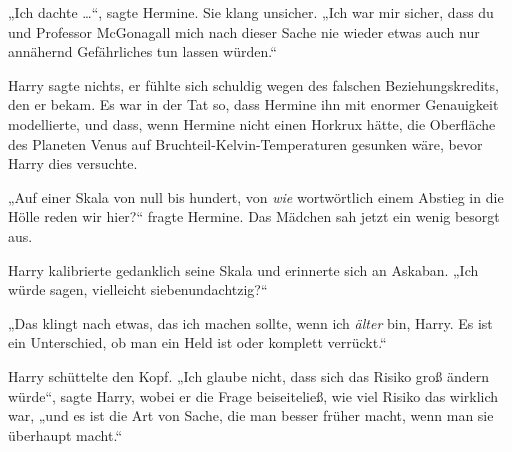 „Ich dachte …“, sagte Hermine. Sie klang unsicher.
„Ich war mir sicher, dass du und Professor McGonagall mich nach dieser Sache nie wieder etwas auch nur annähernd Gefährliches tun lassen würden.“

Harry sagte nichts, er fühlte sich schuldig wegen des falschen Beziehungskredits, den er bekam. Es war in der Tat so, dass Hermine ihn mit enormer Genauigkeit modellierte, und dass, wenn Hermine nicht einen Horkrux hätte, die Oberfläche des Planeten Venus auf Bruchteil-Kelvin-Temperaturen gesunken wäre, bevor Harry dies versuchte.

„Auf einer Skala von null bis hundert, von \emph{wie} wortwörtlich einem Abstieg in die Hölle reden wir hier?“ fragte Hermine. Das Mädchen sah jetzt ein wenig besorgt aus.

Harry kalibrierte gedanklich seine Skala und erinnerte sich an Askaban.
„Ich würde sagen, vielleicht siebenundachtzig?“

„Das klingt nach etwas, das ich machen sollte, wenn ich \emph{älter} bin, Harry. Es ist ein Unterschied, ob man ein Held ist oder komplett verrückt.“

Harry schüttelte den Kopf.
„Ich glaube nicht, dass sich das Risiko groß ändern würde“, sagte Harry, wobei er die Frage beiseiteließ, wie viel Risiko das wirklich war, „und es ist die Art von Sache, die man besser früher macht, wenn man sie überhaupt macht.“

